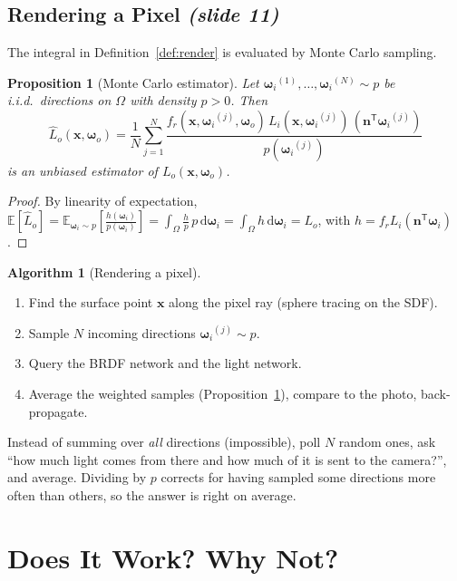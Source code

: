 \documentclass[11pt,a4paper]{article}
\newcommand{\slideone}[1]{\texorpdfstring{\emph{(slide #1)}}{(slide #1)}}
\newcommand{\x}{{\bm{x}}}
\newcommand{\wi}{{\bm{\omega}_i}}
\newcommand{\wo}{{\bm{\omega}_o}}
\newcommand{\n}{{\bm{n}}}
\newcommand{\fr}{f_r}
\newcommand{\Lo}{L_o}
\newcommand{\Li}{L_i}
\theoremstyle{definition}
\newtheorem{algorithm}{Algorithm}[section]
\theoremstyle{plain}
\newtheorem{proposition}[definition]{Proposition}
\theoremstyle{remark}
\begin{document}
\subsection{Rendering a Pixel \slideone{11}}

The integral in Definition~\ref{def:render} is evaluated by Monte Carlo sampling.

\begin{proposition}[Monte Carlo estimator]\label{prop:mc}
Let $\wi^{(1)},\dots,\wi^{(N)}\sim p$ be i.i.d.\ directions on $\Omega$ with density $p>0$. Then
\[
 \widehat L_o(\x,\wo)=\frac1N\sum_{j=1}^N\frac{\fr(\x,\wi^{(j)},\wo)\,\Li(\x,\wi^{(j)})\,(\n^{\mathsf T}\wi^{(j)})}{p(\wi^{(j)})}
\]
is an unbiased estimator of $\Lo(\x,\wo)$.
\end{proposition}
\begin{proof}
By linearity of expectation, $\mathbb E[\widehat L_o]=\mathbb E_{\wi\sim p}\!\left[\tfrac{h(\wi)}{p(\wi)}\right]=\int_\Omega \tfrac{h}{p}\,p\,\mathrm d\wi=\int_\Omega h\,\mathrm d\wi=\Lo$, with $h=\fr\Li(\n^{\mathsf T}\wi)$.
\end{proof}

\begin{algorithm}[Rendering a pixel]
\begin{enumerate}[nosep]
 \item Find the surface point $\x$ along the pixel ray (sphere tracing on the SDF).
 \item Sample $N$ incoming directions $\wi^{(j)}\sim p$.
 \item Query the BRDF network and the light network.
 \item Average the weighted samples (Proposition~\ref{prop:mc}), compare to the photo, back-propagate.
\end{enumerate}
\end{algorithm}

\begin{intuition}
Instead of summing over \emph{all} directions (impossible), poll $N$ random ones, ask ``how much light comes from there and how much of it is sent to the camera?'', and average. Dividing by $p$ corrects for having sampled some directions more often than others, so the answer is right on average.
\end{intuition}

\section{Does It Work? Why Not? }
\end{document}
